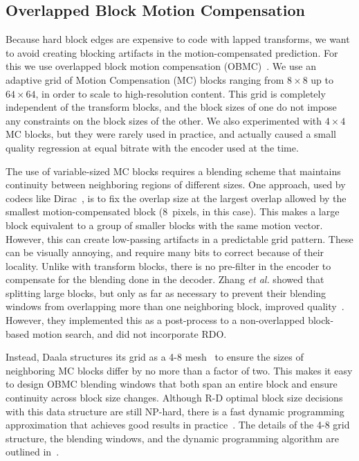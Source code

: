 \documentclass[english,conference,10pt]{IEEEtran}
\begin{document}
\subsection{Overlapped Block Motion Compensation}
\label{sec:OBMC}

Because hard block edges are expensive to code with lapped transforms, we
want to avoid creating blocking artifacts in the motion-compensated
prediction. For this we use overlapped block motion compensation
(OBMC)~\cite{OBMC}. We use an adaptive grid of Motion Compensation
(MC) blocks ranging from $8\times 8$ up to $64\times 64$, in order to scale to
high-resolution content. This grid is completely independent of the transform
blocks, and the block sizes of one do not impose any constraints on the block
sizes of the other.
We also experimented with $4\times 4$ MC blocks, but they were rarely used in
practice, and actually caused a small quality regression at equal bitrate with
the encoder used at the time.

The use of variable-sized MC blocks requires a blending scheme that maintains
continuity between neighboring regions of different sizes. One approach, used
by codecs like Dirac~\cite{Dirac}, is to fix the overlap size at the largest
overlap allowed by the smallest motion-compensated block (8~pixels, in this
case). This makes a large
block equivalent to a group of smaller blocks with the same motion vector.
However, this can create low-passing artifacts in a predictable grid pattern.
These can be visually annoying, and require many bits to correct because of
their locality. Unlike with transform blocks, there is no pre-filter in the
encoder to compensate for the blending done in the decoder.
Zhang \textit{et al.} showed that splitting large blocks,
but only as far as necessary to prevent their blending windows from
overlapping more than one neighboring block, improved quality~\cite{ZAS98}.
However, they implemented this as a post-process to a non-overlapped
block-based motion search, and did not incorporate RDO\@.

Instead, Daala structures its grid as a 4-8 mesh~\cite{DWSMAM97} to ensure the
sizes of neighboring MC blocks differ by no more than a factor of two. This
makes it easy to design OBMC blending windows that both span an entire block
and ensure continuity across block size changes. Although R-D optimal block
size decisions with this data structure are still NP-hard, there is a fast
dynamic programming approximation that achieves good results in
practice~\cite{Bal01}. The details of the 4-8 grid structure, the blending
windows, and the dynamic programming algorithm are outlined in~\cite{OBMC}.
\end{document}
